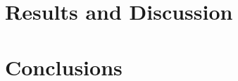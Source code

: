 \documentclass[11pt]{article}
\begin{document}
\section{Results and Discussion}

\section{Conclusions}
\end{document}
